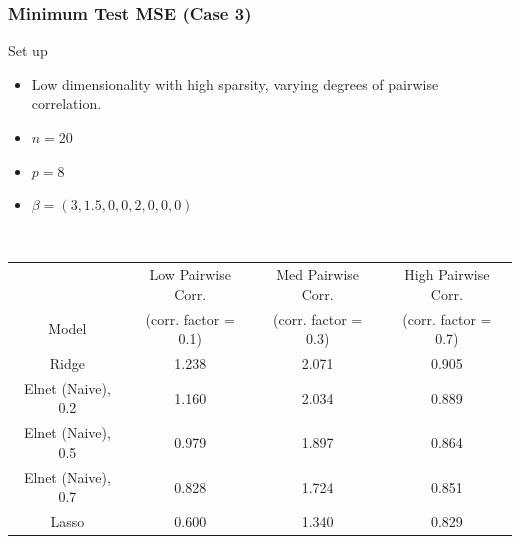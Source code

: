 \begin{frame}[fragile]
\frametitle{Minimum Test MSE (Case 3)}

\begin{block}{Set up}
    \begin{itemize}
        \item Low dimensionality with high sparsity, varying degrees of pairwise correlation.  
        \item $n = 20$
        \item $p = 8$
        \item $\beta = (3, 1.5, 0, 0, 2, 0, 0, 0)$
    \end{itemize}
\end{block} \\

\begin{center}
    
    \begin{tabular}{||c c c c||} 
         \hline
          & Low Pairwise Corr. & Med Pairwise Corr. & High Pairwise Corr. \\ [0.5ex] 
          Model & (corr. factor = 0.1) & (corr. factor = 0.3) & (corr. factor = 0.7)\\ [0.5ex]
         \hline\hline
         Ridge & 1.238 & 2.071 & 0.905\\ 
         \hline
         Elnet (Naive), 0.2 & 1.160 & 2.034 & 0.889\\
         \hline
         Elnet (Naive), 0.5 & 0.979 & 1.897 & 0.864\\
        \hline
         Elnet (Naive), 0.7 & 0.828 & 1.724 & 0.851\\
        \hline
         Lasso & \cellcolor{pink!60}0.600 & \cellcolor{pink!60}1.340 & \cellcolor{pink!60}0.829\\
        \hline
    \end{tabular}

\end{center}
\end{frame}
